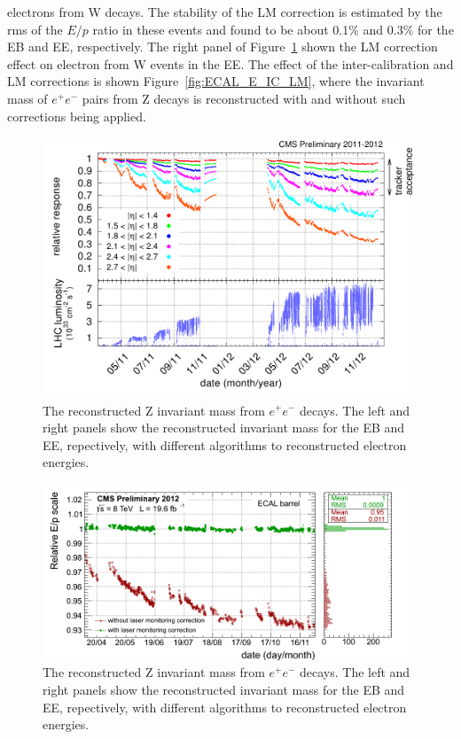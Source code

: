 electrons from W decays. The stability of the LM correction is
estimated by the rms of the $E/p$ ratio in these events and found to
be about 0.1\% and 0.3\% for the EB and EE, respectively. The right
panel of Figure~\ref{fig:ECAL_Transparency1} shown the LM correction
effect on electron from W events in the EE. The effect of the
inter-calibration and LM corrections is shown Figure~\ref{fig:ECAL_E_IC_LM}, where
the invariant mass of $e^{+}e^{-}$ pairs from Z decays is
reconstructed with and without such corrections being applied.
\begin{figure}
 \centering
\includegraphics[width=0.99\textwidth]{CMS_DetectorFigures/histories_2011-2012.png}
\caption{The reconstructed Z invariant mass from $e^{+}e^{-}$
  decays. The left and right panels show the reconstructed invariant mass for
  the EB and EE, repectively, with different algorithms to reconstructed electron energies.\label{fig:ECAL_Transparency1}}
\end{figure}

\begin{figure}
 \centering
\includegraphics[width=0.99\textwidth]{CMS_DetectorFigures/approval_EB_Winter2013.png}
\caption{The reconstructed Z invariant mass from $e^{+}e^{-}$
  decays. The left and right panels show the reconstructed invariant mass for
  the EB and EE, repectively, with different algorithms to reconstructed electron energies.\label{fig:ECAL_response}}
\end{figure}

